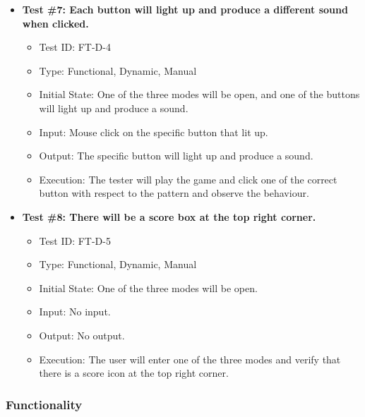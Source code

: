 \documentclass[12pt, titlepage]{article}
\begin{document}
\begin{itemize}
\item \textbf{Test \#7: Each button will light up and produce a different sound when clicked.}
\begin{itemize}
\item Test ID: FT-D-4
\item Type: Functional, Dynamic, Manual 		
\item Initial State: One of the three modes will be open, and one of the buttons will light up and produce a sound.			
\item Input: Mouse click on the specific button that lit up. 					
\item Output: The specific button will light up and produce a sound.					
\item Execution: The tester will play the game and click one of the correct button with respect to the pattern and observe the behaviour.
\end{itemize}

\item \textbf{Test \#8: There will be a score box at the top right corner.}
\begin{itemize}
\item Test ID: FT-D-5
\item Type: Functional, Dynamic, Manual 		
\item Initial State: One of the three modes will be open. 					
\item Input: No input.					
\item Output: No output. 					
\item Execution: The user will enter one of the three modes and verify that there is a score icon at the top right corner.  
\end{itemize}

\end{itemize}

\subsubsection{Functionality}
\end{document}
